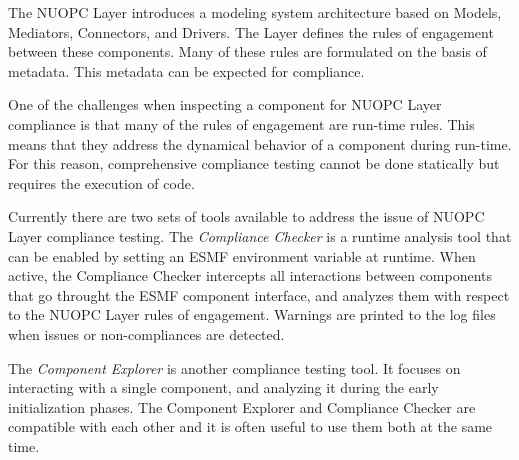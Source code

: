 %

\label{Compliance}

The NUOPC Layer introduces a modeling system architecture based on Models, Mediators, Connectors, and Drivers. The Layer defines the rules of engagement between these components. Many of these rules are formulated on the basis of metadata. This metadata can be expected for compliance.

One of the challenges when inspecting a component for NUOPC Layer compliance is that many of the rules of engagement are run-time rules. This means that they address the dynamical behavior of a component during run-time. For this reason, comprehensive compliance testing cannot be done statically but requires the execution of code.

Currently there are two sets of tools available to address the issue of NUOPC Layer compliance testing. The {\em Compliance Checker} is a runtime analysis tool that can be enabled by setting an ESMF environment variable at runtime. When active, the Compliance Checker intercepts all interactions between components that go throught the ESMF component interface, and analyzes them with respect to the NUOPC Layer rules of engagement. Warnings are printed to the log files when issues or non-compliances are detected.

The {\em Component Explorer} is another compliance testing tool. It focuses on interacting with a single component, and analyzing it during the early initialization phases. The Component Explorer and Compliance Checker are compatible with each other and it is often useful to use them both at the same time.

